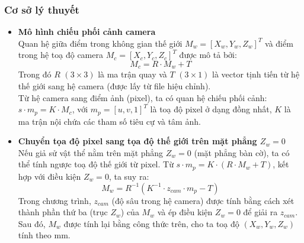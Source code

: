           \subsubsection{Cơ sở lý thuyết}
               \begin{itemize}
                    \item \textbf{Mô hình chiếu phối cảnh camera}\\
                    \hspace*{0.6cm}Quan hệ giữa điểm trong không gian thế giới $M_w = [X_w, Y_w, Z_w]^T$ và điểm trong hệ toạ độ camera $M_c = [X_c, Y_c, Z_c]^T$ được mô tả bởi:
                         \begin{equation}
                         M_c = R \cdot M_w + T
                         \end{equation}
                    \hspace*{0.6cm}Trong đó $R$ $(3 \times 3)$ là ma trận quay và $T$ $(3 \times 1)$ là vector tịnh tiến từ hệ thế giới sang hệ camera (được lấy từ file hiệu chỉnh).\\
                    \hspace*{0.6cm}Từ hệ camera sang điểm ảnh (pixel), ta có quan hệ chiếu phối cảnh: $s \cdot m_p = K \cdot M_c$, với $m_p = [u, v, 1]^T$ là toạ độ pixel ở dạng đồng nhất, $K$ là ma trận nội chứa các tham số tiêu cự và tâm ảnh.
                    \item \textbf{Chuyển tọa độ pixel sang tọa độ thế giới trên mặt phẳng $Z_w = 0$}\\
                    \hspace*{0.6cm}Nếu giả sử vật thể nằm trên mặt phẳng $Z_w = 0$ (mặt phẳng bàn cờ), ta có thể tính ngược toạ độ thế giới từ pixel. Từ $s \cdot m_p = K \cdot (R \cdot M_w + T)$, kết hợp với điều kiện $Z_w = 0$, ta suy ra:
                         \begin{equation}
                         M_w = R^{-1} (K^{-1} \cdot z_{cam} \cdot m_p - T)
                         \end{equation}
                    \hspace*{0.6cm}Trong chương trình, $z_{cam}$ (độ sâu trong hệ camera) được tính bằng cách xét thành phần thứ ba (trục $Z_w$) của $M_w$ và ép điều kiện $Z_w = 0$ để giải ra $z_{cam}$. Sau đó, $M_w$ được tính lại bằng công thức trên, cho ta toạ độ $(X_w, Y_w, Z_w)$ tính theo mm.
               \end{itemize}             
